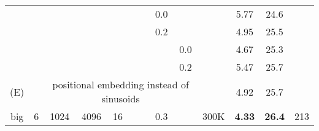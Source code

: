 \begin{table}[t]
\begin{center}
\begin{tabular}{c|ccccccccc|ccc}
      \hline\rule{0pt}{2.0ex}
      \multirow{4}{*}{(D)}
                                  &                                  &                                                               &        &      &     &     & 0.0 &     &       & 5.77          & 24.6          &              \\
                                  &                                  &                                                               &        &      &     &     & 0.2 &     &       & 4.95          & 25.5          &              \\
                                  &                                  &                                                               &        &      &     &     &     & 0.0 &       & 4.67          & 25.3          &              \\
                                  &                                  &                                                               &        &      &     &     &     & 0.2 &       & 5.47          & 25.7          &              \\
      \hline\rule{0pt}{2.0ex}
      (E)                         &                                  & \multicolumn{7}{c}{positional embedding instead of sinusoids} &        & 4.92
                                  & 25.7                             &                                                                                                                                                              \\
      \hline\rule{0pt}{2.0ex}
      big                         & 6                                & 1024                                                          & 4096   & 16   &     &     & 0.3 &     & 300K  & \textbf{4.33} & \textbf{26.4} &
      213                                                                                                                                                                                                                           \\
      \hline
    \end{tabular}
  \end{center}
\end{table}


